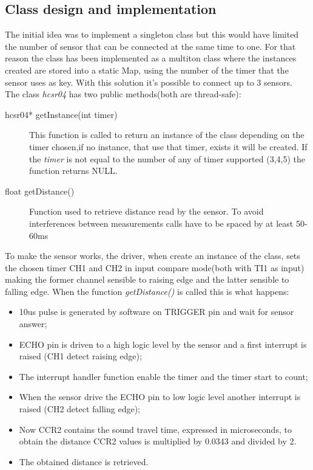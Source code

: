 \subsection{Class design and implementation}
The initial idea was to implement a singleton class but this would have limited the number of sensor that can be connected at the same time to one.
For that reason the class has been implemented as a multiton class where the instances created are stored into a static Map, using the number of the timer that the sensor uses as key. With this solution it's possible to connect up to 3 sensors.\\
The class \textit{hcsr04} has two public methods(both are thread-safe):
\begin{description}
\item [hcsr04* getInstance(int \textunderscore timer)] This function is called to return an instance of the class depending on the timer chosen,if no instance, that use that timer, exists it will be created. If the \textit{ \textunderscore timer} is not equal to the number of any of timer supported (3,4,5) the function returns NULL.
\item [float getDistance()] Function used to retrieve distance read by the sensor. To avoid interferences between measurements calls have to be spaced by at least 50-60ms
\end{description}

To make the sensor works, the driver, when create an instance of the class, sets the chosen timer CH1 and CH2 in input compare mode(both with TI1 as input) making the former channel sensible to raising edge and the latter sensible to falling edge. 
When the function \textit{getDistance()} is called this is what happens:
\begin{itemize}
\item 10us pulse is generated by software on TRIGGER pin and wait for sensor answer;
\item ECHO pin is driven to a high logic level by the sensor and a first interrupt is raised (CH1 detect raising edge);
\item The interrupt handler function enable the timer and the timer start to count;
\item When the sensor drive the ECHO pin to low logic level another interrupt is raised (CH2 detect falling edge);
\item Now CCR2 contains the sound travel time, expressed in microseconds, to obtain the distance CCR2 values is multiplied by 0.0343 and divided by 2.
\item The obtained distance is retrieved.
\end{itemize}

